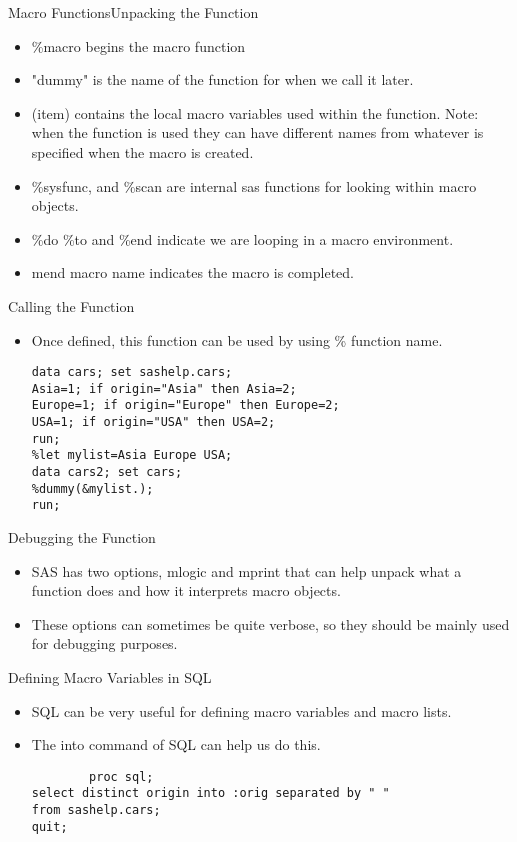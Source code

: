 \documentclass{beamer}
\begin{document}
\begin{frame}[fragile]{Macro Functions}{Unpacking the Function}
\begin{itemize}
    \item \%macro begins the macro function
    \item "dummy" is the name of the function for when we call it later.
    \item (item) contains the local macro variables used within the function.  Note: when the function is used they can have different names from whatever is specified when the macro is created.
    \item \%sysfunc, and \%scan are internal sas functions for looking within macro objects.
    \item \%do \%to and \%end indicate we are looping in a macro environment.
    \item mend macro name indicates the macro is completed.
\end{itemize}
\end{frame}
\begin{frame}[fragile]{Calling the Function}
\begin{itemize}
\item Once defined, this function can be used by using \% function name.
\begin{verbatim}
data cars; set sashelp.cars;
Asia=1; if origin="Asia" then Asia=2;
Europe=1; if origin="Europe" then Europe=2;
USA=1; if origin="USA" then USA=2;
run;
%let mylist=Asia Europe USA;
data cars2; set cars;
%dummy(&mylist.);
run;
\end{verbatim}
\end{itemize}
\end{frame}
\begin{frame}[fragile]{Debugging the Function}
\begin{itemize}
    \item SAS has two options, mlogic and mprint that can help unpack what a function does and how it interprets macro objects.
    \item These options can sometimes be quite verbose, so they should be mainly used for debugging purposes.
\end{itemize}
\end{frame}
\begin{frame}[fragile]{Defining Macro Variables in SQL}
\begin{itemize}
    \item SQL can be very useful for defining macro variables and macro lists.
    \item The into command of SQL can help us do this.
    \begin{verbatim}
        proc sql; 
select distinct origin into :orig separated by " "
from sashelp.cars;
quit;
    \end{verbatim}
\end{itemize}
\end{frame}
\end{document}
